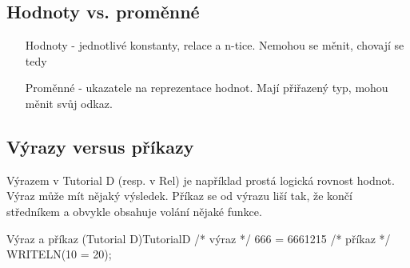 \subsection{Hodnoty vs. proměnné}
\begin{enumerate}
\item[Hodnoty] - jednotlivé konstanty, relace a n-tice. Nemohou se měnit, chovají se tedy 
\item[Proměnné] - ukazatele na reprezentace hodnot. Mají přiřazený typ, mohou měnit svůj odkaz.
\end{enumerate}

\subsection{Výrazy versus příkazy}
Výrazem v Tutorial D (resp. v Rel) je například prostá logická rovnost hodnot. Výraz může mít nějaký výsledek. Příkaz se od výrazu liší tak, že končí středníkem a obvykle obsahuje volání nějaké funkce.
\begin{upcode}{Výraz a příkaz (Tutorial D)}{}{TutorialD}
/* výraz */
666 = 6661215
/* příkaz */
WRITELN(10 = 20);
\end{upcode}

